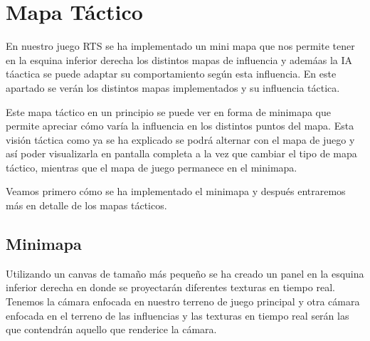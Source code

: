 \section{Mapa Táctico}
En nuestro juego RTS se ha implementado un mini mapa que nos permite tener en
la esquina inferior derecha los distintos mapas de influencia y ademáas la IA táactica se
puede adaptar su comportamiento según esta influencia. En este apartado se verán los
distintos mapas implementados y su influencia táctica.

Este mapa táctico en un principio se puede ver en forma de minimapa que permite apreciar cómo varía la influencia en los distintos puntos del mapa. Esta visión táctica como ya se ha explicado se podrá alternar con el mapa de juego y así poder visualizarla en pantalla completa a la vez que cambiar el tipo de mapa táctico, mientras que el mapa de juego permanece en el minimapa.

Veamos primero cómo se ha implementado el minimapa y después entraremos más en detalle de los mapas tácticos.
\subsection{Minimapa}
Utilizando un canvas de tamaño más pequeño se ha creado un panel en la esquina inferior derecha en donde se proyectarán diferentes texturas en tiempo real. Tenemos la cámara enfocada en nuestro terreno de juego principal y otra cámara enfocada en el terreno de las influencias y las texturas en tiempo real serán las que contendrán aquello que renderice la cámara. 

